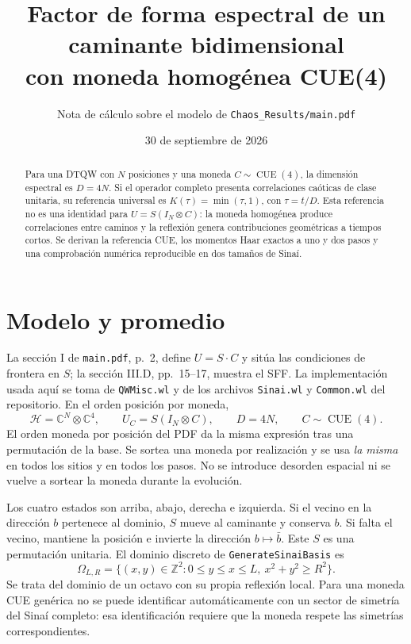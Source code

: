 \documentclass[11pt]{article}
\title{Factor de forma espectral de un caminante bidimensional\\
con moneda homogénea CUE(4)}
\author{Nota de cálculo sobre el modelo de \texttt{Chaos\_Results/main.pdf}}
\date{30 de septiembre de 2026}
\newcommand{\CUE}{\operatorname{CUE}}
\begin{document}
\maketitle

\begin{abstract}
Para una DTQW con $N$ posiciones y una moneda $C\sim\CUE(4)$,
la dimensión espectral es $D=4N$. Si el operador completo presenta
correlaciones caóticas de clase unitaria, su referencia universal es
$K(\tau)=\min(\tau,1)$, con $\tau=t/D$.
Esta referencia no es una identidad para $U=S(I_N\otimes C)$:
la moneda homogénea produce correlaciones entre caminos y la reflexión
genera contribuciones geométricas a tiempos cortos. Se derivan la
referencia CUE, los momentos Haar exactos a uno y dos pasos y una
comprobación numérica reproducible en dos tamaños de Sinaí.
\end{abstract}

\section{Modelo y promedio}
La sección I de \texttt{main.pdf}, p.~2, define $U=S\cdot C$ y sitúa las
condiciones de frontera en $S$; la sección III.D, pp.~15--17, muestra el
SFF. La implementación usada aquí se toma de
\texttt{QWMisc.wl} y de los archivos \texttt{Sinai.wl} y
\texttt{Common.wl} del repositorio. En el orden posición por moneda,
\begin{equation}
 \mathcal H=\mathbb C^N\otimes\mathbb C^4,\qquad
 U_C=S(I_N\otimes C),\qquad D=4N,\qquad C\sim\CUE(4).
 \label{eq:model}
\end{equation}
El orden moneda por posición del PDF da la misma expresión tras una
permutación de la base. Se sortea una moneda por realización y se usa
\emph{la misma} en todos los sitios y en todos los pasos. No se introduce
desorden espacial ni se vuelve a sortear la moneda durante la evolución.

Los cuatro estados son arriba, abajo, derecha e izquierda. Si el vecino
en la dirección $b$ pertenece al dominio, $S$ mueve al caminante y
conserva $b$. Si falta el vecino, mantiene la posición e invierte la
dirección $b\mapsto\bar b$. Este $S$ es una permutación unitaria.
El dominio discreto de \texttt{GenerateSinaiBasis} es
\begin{equation}
 \Omega_{L,R}=\{(x,y)\in\mathbb Z^2:0\leq y\leq x\leq L,
                   \ x^2+y^2\geq R^2\}.
\end{equation}
Se trata del dominio de un octavo con su propia reflexión local.
Para una moneda CUE genérica no se puede identificar automáticamente
con un sector de simetría del Sinaí completo: esa identificación requiere
que la moneda respete las simetrías correspondientes.
\end{document}
